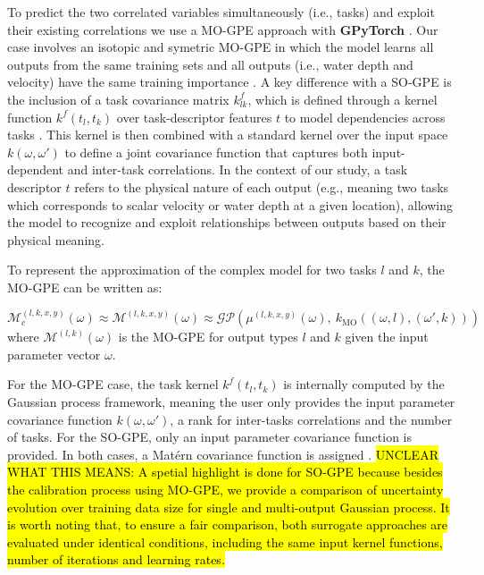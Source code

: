 \documentclass[draft,linenumbers,onecolumn]{agujournal2019} %
\begin{document}
To predict the two correlated variables simultaneously (i.e., tasks) and exploit their existing correlations we use a MO-GPE approach with \textbf{GPyTorch} \cite{gardner2018gpytorch}. Our case involves an isotopic and symetric MO-GPE in which the model learns all outputs from the same training sets and all outputs (i.e., water depth and velocity) have the same training importance \cite{liu2018remarks}. A key difference with a SO-GPE is the inclusion of a task covariance matrix $k_{lk}^{f}$, which is defined through a kernel function $k^{f}{(t_l, t_k)}$ over task-descriptor features $t$ to model dependencies across tasks \cite{bonilla2007multitask}. This kernel is then combined with a standard kernel over the input space $k(\omega, \omega')$ to define a joint covariance function that captures both input-dependent and inter-task correlations. In the context of our study, a task descriptor $t$ refers to the physical nature of each output (e.g., meaning two tasks which corresponds to scalar velocity or water depth at a given location), allowing the model to recognize and exploit relationships between outputs based on their physical meaning. %

%

To represent the approximation of the complex model for two tasks $l$ and $k$, the MO-GPE can be written as:

\begin{equation} \label{eq:mo-gpe}
	\mathcal{M}_c^{(l,k,x,y)}(\omega) \approx \mathcal{M}^{(l,k,x,y)}(\omega) \approx \mathcal{GP}\left(\mu^{(l,k,x,y)}(\omega),\ k_{\text{MO}}\left((\omega, l), (\omega', k)\right)\right)
\end{equation}
where $\mathcal{M}^{(l,k)}(\omega)$ is the MO-GPE for output types $l$ and $k$ given the input parameter vector $\omega$.


For the MO-GPE case, the task kernel $k^{f}{(t_l, t_k)}$ is internally computed by the Gaussian process framework, meaning the user only provides the input parameter covariance function $k(\omega, \omega')$, a rank for inter-tasks correlations and the number of tasks. For the SO-GPE, only an input parameter covariance function is provided. In both cases, a Matérn covariance function is assigned \cite{rasmussen2006gaussian}. \hl{UNCLEAR WHAT THIS MEANS: A spetial highlight is done for SO-GPE because besides the calibration process using MO-GPE, we provide a comparison of uncertainty evolution over training data size for single and multi-output Gaussian process. It is worth noting that, to ensure a fair comparison, both surrogate approaches are evaluated under identical conditions, including the same input kernel functions, number of iterations and learning rates.}
\end{document}
